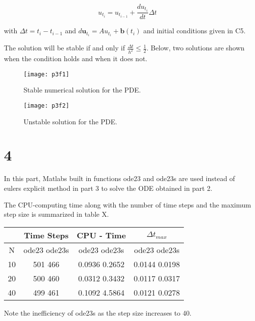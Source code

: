 \documentclass[11pt,a4paper,roman]{scrartcl}
\begin{document}
\begin{equation}
u_{t_i}=u_{t_{i-1}}+\frac{du_{t_i}}{dt}\Delta t
\end{equation}

with $\Delta t =t_i-t_{i-1}$ and $d\bm{u}_{t_i}= Au_{t_i}+\bm{b}(t_i)$ and initial conditions given in C5.

The solution will be stable if and only if $\frac{\Delta t}{h^2}\leq\frac{1}{2}$. Below, two solutions are shown when the condition holds and when it does not.



\begin{figure}[h]
\centering
\texttt{[image: p3f1]}
\caption{Stable numerical solution for the PDE.}
\end{figure}
 
 \begin{figure}[h]
\centering
\texttt{[image: p3f2]}
\caption{Unstable solution for the PDE.}
\end{figure}
 



\section*{4}

In this part, Matlabs built in functions ode23 and ode23s are used instead of eulers explicit method in part 3 to solve the ODE obtained in part 2.

The CPU-computing time along with the number of time steps and the maximum step size is summarized in table X.


\begin{table}[h]
\begin{center}
\begin{tabular}{ | c | c | c |c|}
\hline
   & Time Steps    & CPU - Time      & $\Delta t_{max}$  \\ \hline
N  &  ode23 ode23s &  ode23   ode23s &   ode23 ode23s  \\ \hline
10 &   501   466   &  0.0936  0.2652 &  0.0144  0.0198 \\ \hline 20 &   500   460   &  0.0312  0.3432 &  0.0117  0.0317 \\ \hline
40 &   499   461   &  0.1092 4.5864 &  0.0121  0.0278 \\ \hline
\end{tabular}
\end{center}
\label{Statistics for comparison between ode23 and ode23s}
\end{table}
Note the inefficiency of ode23s as the step size increases to 40.
\end{document}
